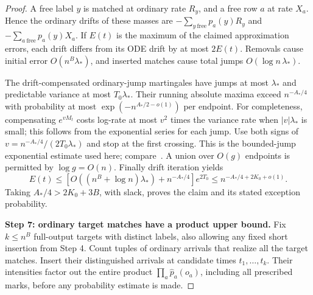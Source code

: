 \begin{proof}
A free label \(y\) is matched at ordinary rate \(R_y\), and a free row
\(a\) at rate \(X_a\). Hence the ordinary drifts of these masses are
\(-\sum_{y\ \mathrm{free}}p_a(y)R_y\) and
\(-\sum_{a\ \mathrm{free}}p_a(y)X_a\). If \(E(t)\) is the maximum of
the claimed approximation errors, each drift differs from its ODE drift
by at most \(2E(t)\). Removals cause initial error
\(O(n^B\lambda_*)\), and inserted matches cause total jumps
\(O(\log n\,\lambda_*)\).

The drift-compensated ordinary-jump martingales have jumps at most
\(\lambda_*\) and predictable variance at most \(T_0\lambda_*\).
Their running absolute maxima exceed \(n^{-A_*/4}\) with probability
at most \(\exp(-n^{A_*/2-o(1)})\) per endpoint. For completeness,
compensating \(e^{vM_t}\) costs log-rate at most \(v^2\) times the
variance rate when \(|v|\lambda_*\) is small; this follows from the
exponential series for each jump. Use both signs of
\(v=n^{-A_*/4}/(2T_0\lambda_*)\) and stop at the first crossing. This
is the bounded-jump exponential estimate used here; compare~\cite{freedman1975}.
A union over \(O(g)\) endpoints is permitted by \(\log g=O(n)\).
Finally drift iteration yields
\[
 E(t)\le
 \left[O((n^B+\log n)\lambda_*)+n^{-A_*/4}\right]e^{2T_0}
 \le n^{-A_*/4+2K_0+o(1)}.
\]
Taking \(A_*/4>2K_0+3B\), with slack, proves the claim and its stated
exception probability.

\noindent\textbf{Step 7: ordinary target matches have a product upper bound.}\quad
Fix \(k\le n^B\) full-output targets with distinct labels, also allowing
any fixed short insertion from Step 4. Count tuples of ordinary arrivals
that realize all the target matches. Insert their distinguished arrivals
at candidate times \(t_1,\ldots,t_k\). Their intensities factor out the
entire product \(\prod_a\widehat p_a(o_a)\), including all prescribed
marks, before any probability estimate is made.


\end{proof}
